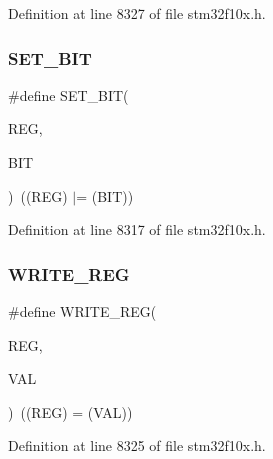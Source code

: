 Definition at line 8327 of file stm32f10x.\+h.

\mbox{\label{group___exported__macro_ga26474f43799fbade9cf300e21dd3a91a}} 
\subsubsection{\texorpdfstring{S\+E\+T\+\_\+\+B\+IT}{SET\_BIT}}
{\footnotesize\ttfamily \#define S\+E\+T\+\_\+\+B\+IT(\begin{DoxyParamCaption}\item[{}]{R\+EG,  }\item[{}]{B\+IT }\end{DoxyParamCaption})~((R\+EG) $\vert$= (B\+IT))}



Definition at line 8317 of file stm32f10x.\+h.

\mbox{\label{group___exported__macro_ga32f78bffcaf6d13023dcd7f05e0c4d57}} 
\subsubsection{\texorpdfstring{W\+R\+I\+T\+E\+\_\+\+R\+EG}{WRITE\_REG}}
{\footnotesize\ttfamily \#define W\+R\+I\+T\+E\+\_\+\+R\+EG(\begin{DoxyParamCaption}\item[{}]{R\+EG,  }\item[{}]{V\+AL }\end{DoxyParamCaption})~((R\+EG) = (V\+AL))}



Definition at line 8325 of file stm32f10x.\+h.

